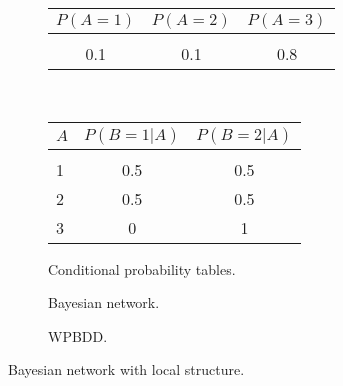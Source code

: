\begin{figure}[H]
    \centering

    \hfill\begin{subfigure}[b]{150pt}
        \centering
        \begin{minipage}{150pt}
            \centering
            \setlength{\tabcolsep}{4pt}
            \begin{small}
                \begin{tabular}[t]{c | c | c}
                    \normalsize{$P(A=1)$} & \normalsize{$P(A=2)$} & \normalsize{$P(A=3)$}\\\hline
                    &&\\[-2ex]
                     0.1 & 0.1 & 0.8
                \end{tabular}
            \end{small}
        \end{minipage}\\\vspace{1em}%
        \begin{minipage}{130pt}
            \centering
            \setlength{\tabcolsep}{4pt}
            \begin{small}
                \begin{tabular}[t]{l || c | c }
                    \normalsize{$A$} & \normalsize{$P(B\!=\!1 | A)$} & \normalsize{$P(B\!=\!2 | A)$}\\\hline
                    &&\\[-2ex]
                    1 &  0.5 & 0.5\\
                    2 &  0.5 & 0.5\\
                    3 &  0 & 1\\
                \end{tabular}
            \end{small}
        \end{minipage}
        \caption{Conditional probability tables.}
        \label{subfig:cpts}
    \end{subfigure}\hfill
    \begin{subfigure}[b]{110pt}
        \centering
        
        \caption{Bayesian network.}
        \label{subfig:bn}
    \end{subfigure}\hfill
    \begin{subfigure}[b]{80pt}
        \centering
        \scalebox{0.9}{
        
        }

        \caption{WPBDD.}
        \label{subfig:bdd}
    \end{subfigure}\hfill


    \caption{Bayesian network with local structure.}
    \label{fig:bn}
\end{figure}

